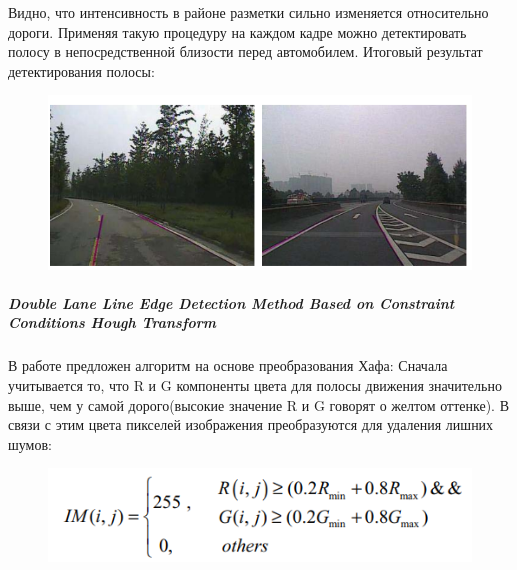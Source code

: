 Видно, что интенсивность в районе разметки сильно изменяется относительно дороги. Применяя такую процедуру на каждом кадре можно детектировать полосу в непосредственной близости перед автомобилем. Итоговый результат детектирования полосы:
\begin{figure}[!h]
	\centering
	\includegraphics[width=1\linewidth]{pictures/screenshot00234}
	\caption{}
	\label{fig:screenshot00234}
\end{figure}

\subparagraph{Double Lane Line Edge Detection Method Based on Constraint Conditions Hough Transform}
В работе \cite{b:lane_detection_hough} предложен алгоритм на основе преобразования Хафа\cite{b:hough_transform}:
Сначала учитывается то, что R и G компоненты цвета для полосы движения значительно выше, чем у самой дорого(высокие значение R и G говорят о желтом оттенке). В связи с этим цвета пикселей изображения преобразуются для удаления лишних шумов:
\begin{figure}[!h]
	\centering
	\includegraphics[width=0.7\linewidth]{pictures/screenshot025}
	\caption{}
	\label{fig:screenshot025}
\end{figure}

